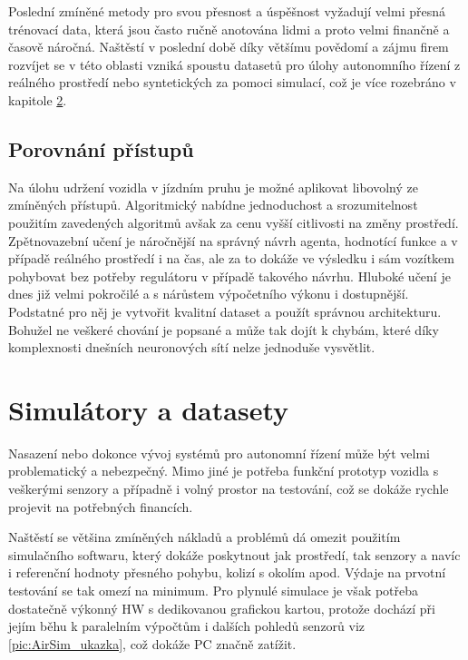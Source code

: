 \documentclass[czech, bc, kky, he, iso690numb]{fasthesis}
\begin{document}
            	Poslední zmíněné metody pro svou přesnost a úspěšnost vyžadují velmi přesná trénovací data, která jsou často ručně anotována lidmi a proto velmi finančně a časově náročná. Naštěstí v poslední době díky většímu povědomí a zájmu firem rozvíjet se v této oblasti vzniká spoustu datasetů pro úlohy autonomního řízení z reálného prostředí nebo syntetických za pomoci simulací, což je více rozebráno v kapitole \ref{chap:simulatory}.
            
    	\section{Porovnání přístupů}
    		Na úlohu udržení vozidla v jízdním pruhu je možné aplikovat libovolný ze zmíněných přístupů. Algoritmický nabídne jednoduchost a srozumitelnost použitím zavedených algoritmů avšak za cenu vyšší citlivosti na změny prostředí. Zpětnovazební učení je náročnější na správný návrh agenta, hodnotící funkce a v případě reálného prostředí i na čas, ale za to dokáže ve výsledku i sám vozítkem pohybovat bez potřeby regulátoru v případě takového návrhu. Hluboké učení je dnes již velmi pokročilé a s nárůstem výpočetního výkonu i dostupnější. Podstatné pro něj je vytvořit kvalitní dataset a použít správnou architekturu. Bohužel ne veškeré chování je popsané a může tak dojít k chybám, které díky komplexnosti dnešních neuronových sítí nelze jednoduše vysvětlit.
    \chapter{Simulátory a datasety}\label{chap:simulatory}
    	Nasazení nebo dokonce vývoj systémů pro autonomní řízení může být velmi problematický a nebezpečný. Mimo jiné je potřeba funkční prototyp vozidla s veškerými senzory a případně i volný prostor na testování, což se dokáže rychle projevit na potřebných financích.
    	
    	Naštěstí se většina zmíněných nákladů a problémů dá omezit použitím simulačního softwaru, který dokáže poskytnout jak prostředí, tak senzory a navíc i referenční hodnoty přesného pohybu, kolizí s okolím apod. Výdaje na prvotní testování se tak omezí na minimum. Pro plynulé simulace je však potřeba dostatečně výkonný HW s dedikovanou grafickou kartou, protože dochází při jejím běhu k paralelním výpočtům i dalších pohledů senzorů viz \ref{pic:AirSim_ukazka}, což dokáže PC značně zatížit.
\end{document}
